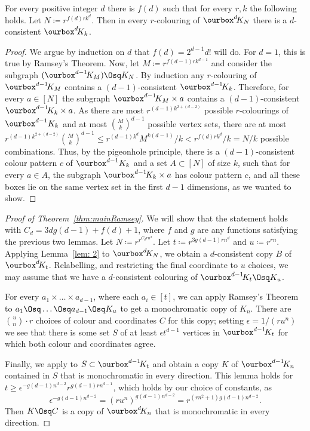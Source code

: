 \begin{lemma}\label{lem: 2}
For every positive integer $d$ there is $f(d)$ such that for every $r,k$ the following holds. Let $N\coloneqq r^{f(d)rk^{d}}$. Then in every $r$-colouring of $\ourbox^{d}\!K_N$ there is a $d$-consistent $\ourbox^{d}\!K_k$. 
\end{lemma}
\begin{proof}
We argue by induction on $d$ that $f(d)=2^{d-1}d!$ will do. For $d=1$, this is true by Ramsey's Theorem. 
Now, let $M\coloneqq r^{f(d-1)rk^{d-1}}$ and consider the subgraph $(\ourbox^{d-1}\!K_{M})\Osq K_N$. By induction any $r$-colouring of $\ourbox^{d-1}\!K_{M}$ contains a $(d-1)$-consistent $\ourbox^{d-1}\!K_k$. Therefore, for every $a\in [N]$ the subgraph $\ourbox^{d-1}\!K_{M}\times a$ contains a $(d-1)$-consistent $\ourbox^{d-1}\!K_k\times a $.
 As there are most $r^{(d-1)k^{2+(d-2)}}$ possible $r$-colourings of $\ourbox^{d-1}K_k$ and at most $\binom{M}{k}^{d-1}$ possible vertex sets, 
 there are at most $r^{(d-1)k^{2+(d-2)}}\binom{M}{k}^{d-1}\le r^{(d-1)k^d}M^{k(d-1)}/k< r^{f(d)rk^d}/k=N/k$ possible combinations.
Thus, by the pigeonhole principle, there is a $(d-1)$-consistent colour pattern $c$ of $\ourbox^{d-1}K_k$ and a set $A\subset [N]$ of size $k$, such that for every $a\in A$, the subgraph $\ourbox^{d-1}\!K_k \times a$ has colour pattern $c$, and all these boxes lie on the same vertex set in the first $d-1$ dimensions, as we wanted to show. 
\end{proof}

\begin{proof}[Proof of Theorem~\ref{thm:mainRamsey}]
We will show that the statement holds with $C_d=3dg(d-1)+f(d)+1$, where $f$ and $g$ are
any functions satisfying the previous two lemmas.
Let $N\coloneqq r^{r^{C_drn^{d}}}$. Let $t\coloneqq r^{3g(d-1)rn^{d}}$ and $u\coloneqq r^{rn}$. 
Applying Lemma~\ref{lem: 2} to $\ourbox^{d}\!K_{N}$, we obtain a $d$-consistent copy $B$ of $\ourbox^{d}\!K_t$. Relabelling, and restricting the final coordinate to $u$ choices, we may assume that we have a $d$-consistent colouring of $\ourbox^{d-1}\!K_t\Osq K_u$. 

For every $a_1\times \dots \times a_{d-1}$, where each $a_i\in [t]$, we can apply Ramsey's Theorem to $a_1\Osq \dots \Osq a_{d-1}\Osq K_{u}$ to get a monochromatic copy of $K_n$. 
There are $\binom{u}{n}\cdot r$ choices of colour and coordinates $C$ for this copy; setting
$\epsilon=1/(ru^{n})$ we see that there is some set $S$ of at least $\epsilon t^{d-1}$ vertices in $\ourbox^{d-1}\!K_t$ for which both colour and coordinates agree.

%
%
%

Finally, we apply  to 
$S\subset\ourbox^{d-1}\!K_t$
and obtain a copy $K$ of $\ourbox^{d-1}\!K_n$ contained in $S$ that is monochromatic in every direction. This lemma holds for
$t\ge \epsilon^{-g(d-1)n^{d-2}}r^{g(d-1)rn^{d-1}}$, which holds by our choice of constants,
as 
$$\epsilon^{-g(d-1)n^{d-2}}
=(ru^n)^{g(d-1)n^{d-2}}
=r^{(rn^2+1)g(d-1)n^{d-2}}.$$
Then $K\Osq C$ is a copy of $\ourbox^{d}\!K_n$ that is monochromatic in every direction.
%
\end{proof}
